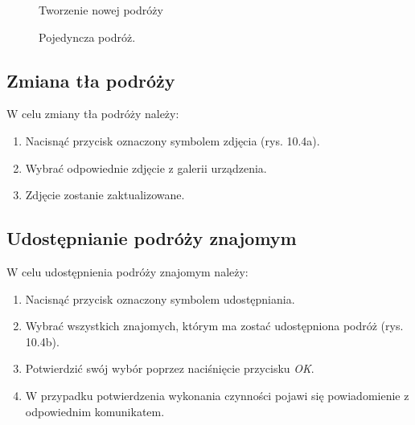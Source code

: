 \begin{figure}[h]
\centering
\null\hfill
{}
\hfill
{}
\hfill
{}
\hfill\null

\caption{Tworzenie nowej podróży}
\label{fig:podrecznik2}
\end{figure}
\FloatBarrier

\begin{figure}[h]
\centering

\centering
\null\hfill
{}
\hfill
{}
\hfill\null

\caption{Pojedyncza podróż.}
\label{fig:podrecznik3}
\end{figure}
\FloatBarrier

\subsection{Zmiana tła podróży}

W celu zmiany tła podróży należy:
\begin{enumerate}
\item Nacisnąć przycisk oznaczony symbolem zdjęcia (rys. 10.4a).
\item Wybrać odpowiednie zdjęcie z galerii urządzenia.
\item Zdjęcie zostanie zaktualizowane.
\end{enumerate}

\subsection{Udostępnianie podróży znajomym}

W celu udostępnienia podróży znajomym należy:
\begin{enumerate}
\item Nacisnąć przycisk oznaczony symbolem udostępniania.
\item Wybrać wszystkich znajomych, którym ma zostać udostępniona podróż (rys. 10.4b).
\item Potwierdzić swój wybór poprzez naciśnięcie przycisku \textit{OK}.
\item W przypadku potwierdzenia wykonania czynności pojawi się powiadomienie z odpowiednim komunikatem.
\end{enumerate}

